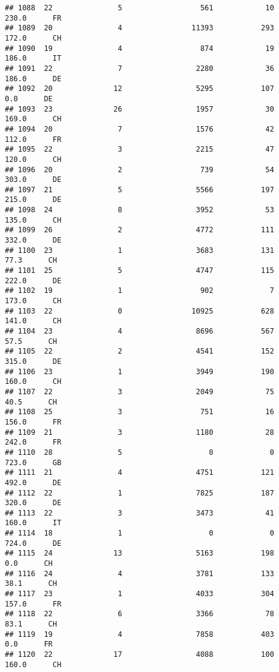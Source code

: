 \documentclass[
]{article}
\begin{document}
\begin{verbatim}
## 1088  22               5                  561            10    230.0      FR
## 1089  20               4                11393           293    172.0      CH
## 1090  19               4                  874            19    186.0      IT
## 1091  22               7                 2280            36    186.0      DE
## 1092  20              12                 5295           107      0.0      DE
## 1093  23              26                 1957            30    169.0      CH
## 1094  20               7                 1576            42    112.0      FR
## 1095  22               3                 2215            47    120.0      CH
## 1096  20               2                  739            54    303.0      DE
## 1097  21               5                 5566           197    215.0      DE
## 1098  24               8                 3952            53    135.0      CH
## 1099  26               2                 4772           111    332.0      DE
## 1100  23               1                 3683           131     77.3      CH
## 1101  25               5                 4747           115    222.0      DE
## 1102  19               1                  902             7    173.0      CH
## 1103  22               0                10925           628    141.0      CH
## 1104  23               4                 8696           567     57.5      CH
## 1105  22               2                 4541           152    315.0      DE
## 1106  23               1                 3949           190    160.0      CH
## 1107  22               3                 2049            75     40.5      CH
## 1108  25               3                  751            16    156.0      FR
## 1109  21               3                 1180            28    242.0      FR
## 1110  28               5                    0             0    723.0      GB
## 1111  21               4                 4751           121    492.0      DE
## 1112  22               1                 7825           187    320.0      DE
## 1113  22               3                 3473            41    160.0      IT
## 1114  18               1                    0             0    724.0      DE
## 1115  24              13                 5163           198      0.0      CH
## 1116  24               4                 3781           133     38.1      CH
## 1117  23               1                 4033           304    157.0      FR
## 1118  22               6                 3366            78     83.1      CH
## 1119  19               4                 7858           403      0.0      FR
## 1120  22              17                 4088           100    160.0      CH

\end{verbatim}
\end{document}
